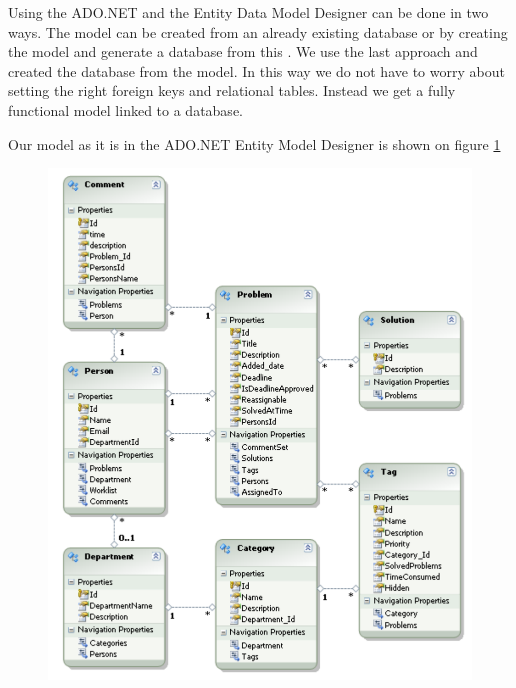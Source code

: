 Using the ADO.NET and the Entity Data Model Designer can be done in two ways. 
The model can be created from an already existing database or by creating the model and generate a database from this \cite{adonetEntityDataModelDesigner}.
We use the last approach and created the database from the model. 
In this way we do not have to worry about setting the right foreign keys and relational tables. Instead we get a fully functional model linked to a database. 

Our model as it is in the ADO.NET Entity Model Designer is shown on figure \ref{fig:edmxModel}
\begin{figure}[htb]
	\centering
		\includegraphics[scale=0.7]{input/implementation/mvc/Model.pdf}
	\label{fig:edmxModel}
\end{figure}

